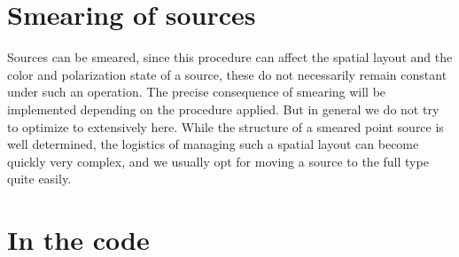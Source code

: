 \documentclass[a4paper,12pt,twoside]{article}
\begin{document}
\section{Smearing of sources}
Sources can be smeared, since this procedure can affect the spatial layout and the color and polarization state of a source, these do not necessarily remain constant under such an operation. The precise consequence of smearing will be implemented depending on the procedure applied. But in general we do not try to optimize to extensively here. While the structure of a smeared point source is well determined, the logistics of managing such a spatial layout can become quickly very complex, and we usually opt for moving a source to the full type quite easily.
\section{In the code}
\end{document}
